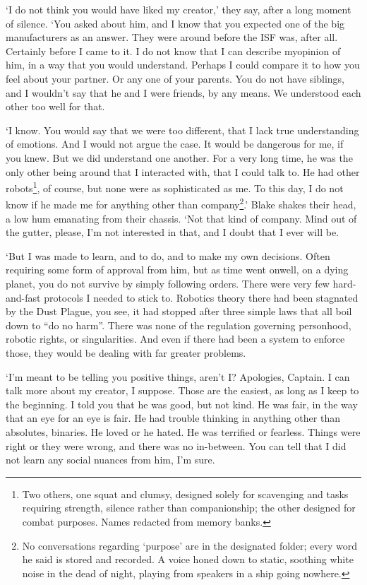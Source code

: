 `I do not think you would have liked my creator,' they say, after a
long moment of silence. `You asked about him, and I know that you
expected one of the big manufacturers as an answer. They were around
before the ISF was, after all. Certainly before I came to it. I do not
know that I can describe my\textellipsis opinion of him, in a way
that you would understand. Perhaps I could compare it to how you feel
about your partner. Or any one of your parents. You do not have
siblings, and I wouldn't say that he and I were friends, by any
means. We understood each other too well for that.

`I know. You would say that we were too different, that I lack true
understanding of emotions. And I would not argue the case. It would be
dangerous for me, if you knew. But we did understand one another. For
a very long time, he was the only other being around that I interacted
with, that I could talk to. He had other robots\footnote{Two others,
one squat and clumsy, designed solely for scavenging and tasks
requiring strength, silence rather than companionship; the other
designed for combat purposes. Names redacted from memory banks.}, of
course, but none were as sophisticated as me. To this day, I do not
know if he made me for anything other than company\footnote{No
conversations regarding `purpose' are in the designated folder; every
word he said is stored and recorded. A voice honed down to static,
soothing white noise in the dead of night, playing from speakers in a
ship going nowhere.}.' Blake shakes their head, a low hum emanating
from their chassis. `Not that kind of company. Mind out of the gutter,
please, I'm not interested in that, and I doubt that I ever will be.

`But I was made to learn, and to do, and to make my own
decisions. Often requiring some form of approval from him, but as time
went on\textellipsis well, on a dying planet, you do not survive by
simply following orders. There were very few hard-and-fast protocols I
needed to stick to. Robotics theory there had been stagnated by the
Dust Plague, you see, it had stopped after three simple laws that all
boil down to ``do no harm''. There was none of the regulation
governing personhood, robotic rights, or singularities. And even if
there had been a system to enforce those, they would be dealing with
far greater problems.

`I'm meant to be telling you positive things, aren't I? Apologies,
Captain. I can talk more about my creator, I suppose. Those are the
easiest, as long as I keep to the beginning. I told you that he was
good, but not kind. He was fair, in the way that an eye for an eye is
fair. He had trouble thinking in anything other than absolutes,
binaries. He loved or he hated. He was terrified or fearless. Things
were right or they were wrong, and there was no in-between. You can
tell that I did not learn any social nuances from him, I'm sure.

